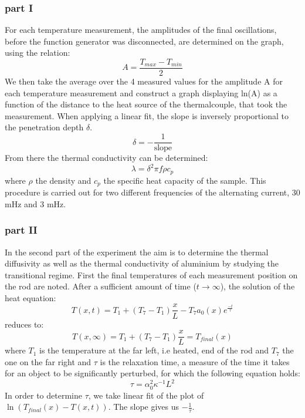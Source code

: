 \documentclass{scrartcl}
\begin{document}
\subsubsection{part I}
 For each temperature measurement, the amplitudes of the final oscillations, before the function generator was disconnected, are determined on the graph, using the relation:
\[A=\frac{T_{max}-T_{min}}{2}\]
We then take the average over the 4 measured values for the amplitude A for each temperature measurement and construct a graph displaying ln(A) as a function of the distance to the heat source of the thermalcouple, that took the measurement. When applying a linear fit, the slope is inversely proportional to the penetration depth $\delta$.
\[\delta = -\frac{1}{\text{slope}}\]
From there the thermal conductivity can be determined:
\begin{equation}
    \lambda = \delta^2\pi f\rho c_p
    \label{equation_lambda}
\end{equation}
where $\rho$ the density and $c_p$ the specific heat capacity of the sample.
This procedure is carried out for two different frequencies of the alternating current, 30 mHz and 3 mHz. 
\subsubsection{part II}
In the second part of the experiment the aim is to determine the thermal diffusivity as well as the thermal conductivity of aluminium by studying the transitional regime. 
First the final temperatures of each measurement position on the rod are noted. After a sufficient amount of time ($t\rightarrow\infty$), the solution of the heat equation:
\begin{equation}
    T(x,t)=T_1+(T_7-T_1)\frac{x}{L}-T_7a_0(x)e^{\frac{-t}{\tau}}
\end{equation}
reduces to:
\begin{equation*}
    T(x,\infty)=T_1+(T_7-T_1)\frac{x}{L}=T_{final}(x)
\end{equation*}
where $T_1$ is the temperature at the far left, i.e heated, end of the rod and $T_7$ the one on the far right and $\tau$ is the relaxation time, a measure of the time it takes for an object to be significantly perturbed, for which the following equation holds:
\begin{equation}
    \tau = \alpha_0^2\kappa^{-1}L^2
    \label{equ4}
\end{equation}
In order to determine $\tau$, we take linear fit of the plot of $\ln({T_{final}(x)-T(x,t)})$. The slope gives us $-\frac{1}{\tau}$.\\
\end{document}
